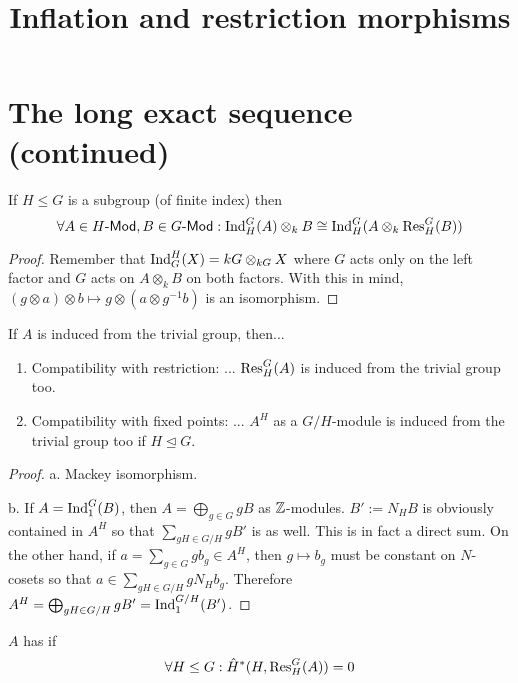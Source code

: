 \documentclass[fontsize=11pt,fleqn,a4paper]{scrartcl}
\title{Inflation and restriction morphisms}
\begin{document}
\maketitle

\setcounter{section}{2}
\section{The long exact sequence (continued)}

\setcounter{theoremnumber}{9}
\begin{proposition}
If $H\leq G$ is a subgroup (of finite index) then
\[\forall A\in H\textsf{-Mod}, B\in G\textsf{-Mod}: \operatorname{Ind}_H^G(A) \otimes_k B \cong \operatorname{Ind}_H^G(A\otimes_k \operatorname{Res}_H^G(B))\]
\end{proposition}
\begin{proof}
Remember that $\operatorname{Ind}_G^H(X) = kG \otimes_{kG} X$ where $G$ acts only on the left factor and $G$ acts on $A \otimes_k B$ on both factors. With this in mind, 
$(g\otimes a)\otimes b \mapsto g\otimes(a\otimes g^{-1} b)$ is an isomorphism.
\end{proof}

\begin{proposition}
If $A$ is induced from the trivial group, then...
\begin{enumerate}
\item Compatibility with restriction: ... $\operatorname{Res}_H^G(A)$ is induced from the trivial group too.
\item Compatibility with fixed points: ... $A^H$ as a $G/H$-module is induced from the trivial group too if $H\unlhd G$.
\end{enumerate}
\end{proposition}
\begin{proof}
a. Mackey isomorphism.

b. If $A=\operatorname{Ind}_1^G(B)$, then $A = \bigoplus_{g\in G} gB$ as $\mathbb{Z}$-modules. $B':=N_H B$ is obviously contained in $A^H$ so that $\sum_{gH\in G/H} gB'$ is as well. This is in fact a direct sum. On the other hand, if $a=\sum_{g\in G} gb_g \in A^H$, then $g\mapsto b_g$ must be constant on $N$-cosets so that $a\in \sum_{gH\in G/H} gN_H b_g$. Therefore $A^H = \bigoplus_{gH\in G/H} g B' = \operatorname{Ind}_1^{G/H}(B')$.
\end{proof}

\begin{definition}
$A$ has  if
\[\forall H\leq G: \hat{H}^\ast(H,\operatorname{Res}_H^G(A)) = 0\]
\end{definition}
\end{document}
